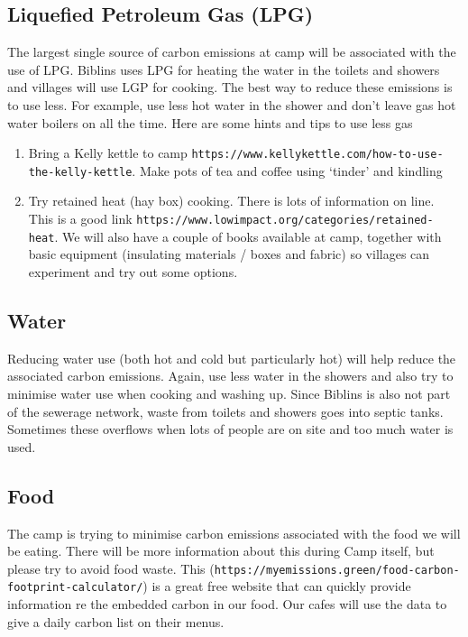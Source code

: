 \documentclass[a4paper, 11pt]{report}
\begin{document}
\subsection{Liquefied Petroleum Gas (LPG)}
The largest single source of carbon emissions at camp will be associated with the use of LPG. Biblins uses LPG for heating the water in the toilets and showers and villages will use LGP for cooking. The best way to reduce these emissions is to use less. For example, use less hot water in the shower and don’t leave gas hot water boilers on all the time. Here are some hints and tips to use less gas
\begin{enumerate}
    \item Bring a Kelly kettle to camp \texttt{https://www.kellykettle.com/how-to-use-the-kelly-kettle}. Make pots of tea and coffee using `tinder' and kindling
    \item Try retained heat (hay box) cooking. There is lots of information on line. This is a good link \texttt{https://www.lowimpact.org/categories/retained-heat}. We will also have a couple of books available at camp, together with basic equipment (insulating materials / boxes and fabric) so villages can experiment and try out some options.
\end{enumerate}

\subsection{Water}
Reducing water use (both hot and cold but particularly hot) will help reduce the associated carbon emissions. Again, use less water in the showers and also try to minimise water use when cooking and washing up. Since Biblins is also not part of the sewerage network, waste from toilets and showers goes into septic tanks. Sometimes these overflows when lots of people are on site and too much water is used.

\subsection{Food}
The camp is trying to minimise carbon emissions associated with the food we will be eating. There will be more information about this during Camp itself, but please try to avoid food waste. This (\texttt{https://myemissions.green/food-carbon-footprint-calculator/}) is a great free website that can quickly provide information re the embedded carbon in our food. Our cafes will use the data to give a daily carbon list on their menus. 
\end{document}
